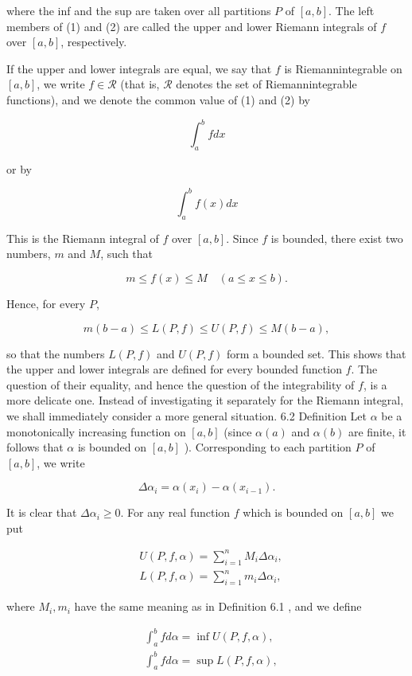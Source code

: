 \documentclass[10pt]{article}
\begin{document}
where the inf and the sup are taken over all partitions $P$ of $[a, b]$. The left members of (1) and (2) are called the upper and lower Riemann integrals of $f$ over $[a, b]$, respectively.

If the upper and lower integrals are equal, we say that $f$ is Riemannintegrable on $[a, b]$, we write $f \in \mathscr{R}$ (that is, $\mathscr{R}$ denotes the set of Riemannintegrable functions), and we denote the common value of (1) and (2) by

$$
\int_{a}^{b} f d x
$$

or by

$$
\int_{a}^{b} f(x) d x
$$

This is the Riemann integral of $f$ over $[a, b]$. Since $f$ is bounded, there exist two numbers, $m$ and $M$, such that

$$
m \leq f(x) \leq M \quad(a \leq x \leq b) .
$$

Hence, for every $P$,

$$
m(b-a) \leq L(P, f) \leq U(P, f) \leq M(b-a),
$$

so that the numbers $L(P, f)$ and $U(P, f)$ form a bounded set. This shows that the upper and lower integrals are defined for every bounded function $f$. The question of their equality, and hence the question of the integrability of $f$, is a more delicate one. Instead of investigating it separately for the Riemann integral, we shall immediately consider a more general situation. 6.2 Definition Let $\alpha$ be a monotonically increasing function on $[a, b]$ (since $\alpha(a)$ and $\alpha(b)$ are finite, it follows that $\alpha$ is bounded on $[a, b]$ ). Corresponding to each partition $P$ of $[a, b]$, we write

$$
\Delta \alpha_{i}=\alpha\left(x_{i}\right)-\alpha\left(x_{i-1}\right) .
$$

It is clear that $\Delta \alpha_{i} \geq 0$. For any real function $f$ which is bounded on $[a, b]$ we put

$$
\begin{aligned}
& U(P, f, \alpha)=\sum_{i=1}^{n} M_{i} \Delta \alpha_{i}, \\
& L(P, f, \alpha)=\sum_{i=1}^{n} m_{i} \Delta \alpha_{i},
\end{aligned}
$$

where $M_{i}, m_{i}$ have the same meaning as in Definition 6.1 , and we define

$$
\begin{aligned}
& \int_{a}^{b} f d \alpha=\inf U(P, f, \alpha), \\
& \int_{a}^{b} f d \alpha=\sup L(P, f, \alpha),
\end{aligned}
$$
\end{document}
